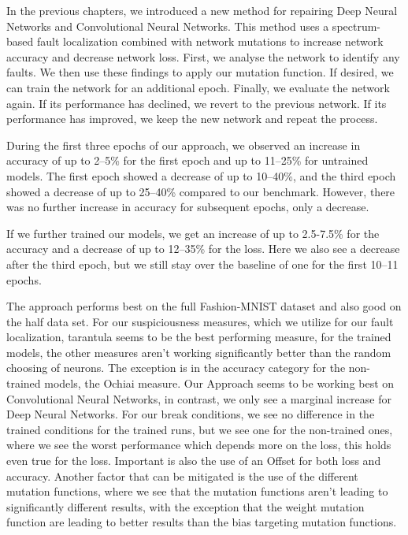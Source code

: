 In the previous chapters, we introduced a new method for repairing Deep Neural Networks and Convolutional Neural Networks.
This method uses a spectrum-based fault localization combined with network mutations to increase network accuracy and decrease network loss.
First, we analyse the network to identify any faults.
We then use these findings to apply our mutation function.
If desired, we can train the network for an additional epoch.
Finally, we evaluate the network again.
If its performance has declined, we revert to the previous network.
If its performance has improved, we keep the new network and repeat the process.

During the first three epochs of our approach, we observed an increase in accuracy of up to 2--5\% for the first epoch and up to 11--25\% for untrained models.
The first epoch showed a decrease of up to 10--40\%, and the third epoch showed a decrease of up to 25--40\% compared to our benchmark.
However, there was no further increase in accuracy for subsequent epochs, only a decrease.

If we further trained our models, we get an increase of up to 2.5-7.5\% for the accuracy and a decrease of up to 12--35\% for the loss.
Here we also see a decrease after the third epoch, but we still stay over the baseline of one for the first 10–11 epochs.

The approach performs best on the full Fashion-MNIST dataset and also good on the half data set.
For our suspiciousness measures, which we utilize for our fault localization, tarantula seems to be the best performing measure, for the trained models, the other measures aren't working significantly better than the random choosing of neurons.
The exception is in the accuracy category for the non-trained models, the Ochiai measure.
Our Approach seems to be working best on Convolutional Neural Networks, in contrast, we only see a marginal increase for Deep Neural Networks.
For our break conditions, we see no difference in the trained conditions for the trained runs, but we see one for the non-trained ones, where we see the worst performance which depends more on the loss, this holds even true for the loss.
Important is also the use of an Offset for both loss and accuracy.
Another factor that can be mitigated is the use of the different mutation functions, where we see that the mutation functions aren't leading to significantly different results, with the exception that the weight mutation function are leading to better results than the bias targeting mutation functions.

